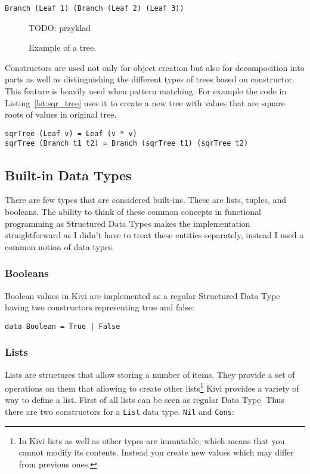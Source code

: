 \documentclass[a4paper]{report}
\begin{document}
\begin{lstlisting}
Branch (Leaf 1) (Branch (Leaf 2) (Leaf 3))
\end{lstlisting}

\begin{figure}[h!]
  \centering

  TODO: przyklad

  \caption{Example of a tree.}
  \label{fig:tree}
\end{figure}

Constructors are used not only for object creation but also for decomposition
into parts as well as distinguishing the different types of trees based on
constructor. This feature is heavily used when pattern matching. For example
the code in Listing~\ref{lst:sqr_tree} uses it to create a new tree with values
that are square roots of values in original tree.

\begin{lstlisting}[label=lst:sqr_tree,caption={Creating a `square rooted` tree.}]
sqrTree (Leaf v) = Leaf (v * v)
sqrTree (Branch t1 t2) = Branch (sqrTree t1) (sqrTree t2)
\end{lstlisting}

\subsection{Built-in Data Types}
There are few types that are considered built-ins. These are lists, tuples,
and booleans. The ability to think of these common concepts in functional
programming as Structured Data Types makes the implementation straightforward
as I didn't have to treat these entities separately, instead I used a common
notion of data types.
\subsubsection{Booleans}
Boolean values in Kivi are implemented as a regular Structured Data Type having
two constructors representing true and false:

\begin{lstlisting}
data Boolean = True | False
\end{lstlisting}

\subsubsection{Lists}
Lists are structures that allow storing a number of items. They
provide a set of operations on them that allowing to create other
lists\footnote{In Kivi lists as well as other types are immutable, which means
that you cannot modify its contents. Instead you create new values which may
differ from previous ones. }
Kivi provides a variety of way to define a list. First of all lists can be seen
as regular Data Type. Thus there are two constructors for a \texttt{List}
data type. \texttt{Nil} and \texttt{Cons}:
\end{document}
